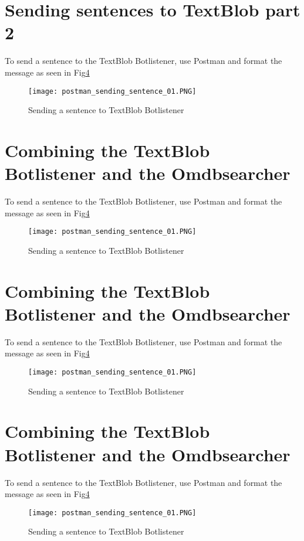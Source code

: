 \documentclass[11pt,fleqn]{book} %
\begin{document}
\newpage
\section{Sending sentences to TextBlob part 2}
To send a sentence to the TextBlob Botlistener, use Postman and format the message as seen in Fig\ref{fig:sending-botlistener}
\begin{figure}[]
  \centering
   \texttt{[image: postman\_sending\_sentence\_01.PNG]}
  \caption{Sending a sentence to TextBlob Botlistener}
  \label{fig:sending-botlistener}
\end{figure}

\newpage
\section{Combining the TextBlob Botlistener and the Omdbsearcher}
To send a sentence to the TextBlob Botlistener, use Postman and format the message as seen in Fig\ref{fig:sending-botlistener}
\begin{figure}[]
  \centering
   \texttt{[image: postman\_sending\_sentence\_01.PNG]}
  \caption{Sending a sentence to TextBlob Botlistener}
  \label{fig:sending-botlistener}
\end{figure}

\section{Combining the TextBlob Botlistener and the Omdbsearcher}
To send a sentence to the TextBlob Botlistener, use Postman and format the message as seen in Fig\ref{fig:sending-botlistener}
\begin{figure}[]
  \centering
   \texttt{[image: postman\_sending\_sentence\_01.PNG]}
  \caption{Sending a sentence to TextBlob Botlistener}
  \label{fig:sending-botlistener}
\end{figure}
\newpage
\section{Combining the TextBlob Botlistener and the Omdbsearcher}
To send a sentence to the TextBlob Botlistener, use Postman and format the message as seen in Fig\ref{fig:sending-botlistener}
\begin{figure}[]
  \centering
   \texttt{[image: postman\_sending\_sentence\_01.PNG]}
  \caption{Sending a sentence to TextBlob Botlistener}
  \label{fig:sending-botlistener}
\end{figure}
\newpage
\end{document}
